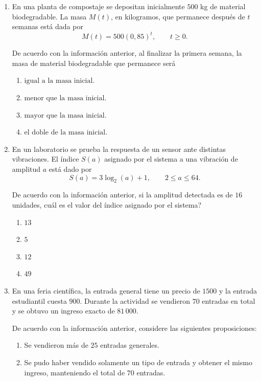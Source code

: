\documentclass[12pt]{article}
\newcommand{\opcion}[2]{\item $#2$}
\begin{document}
\begin{enumerate}[label=\textbf{\arabic*.}, start=29, itemsep=1cm]
\begin{enumerate}[label=\Alph*)]
  \opcion{A}{3}
  \opcion{B}{4}
  \opcion{C}{5}
  \opcion{D}{6}
\end{enumerate}

\Needspace{0.34\textheight}
\item
En una planta de compostaje se depositan inicialmente $500$ kg de material biodegradable. La masa $M(t)$, en kilogramos, que permanece despu\'es de $t$ semanas est\'a dada por
\[
  M(t)=500(0{,}85)^t, \qquad t\geq 0.
\]

De acuerdo con la informaci\'on anterior, al finalizar la primera semana, la masa de material biodegradable que permanece ser\'a

\begin{enumerate}[label=\Alph*)]
  \opcion{A}{\text{igual a la masa inicial.}}
  \opcion{B}{\text{menor que la masa inicial.}}
  \opcion{C}{\text{mayor que la masa inicial.}}
  \opcion{D}{\text{el doble de la masa inicial.}}
\end{enumerate}

\Needspace{0.34\textheight}
\item
En un laboratorio se prueba la respuesta de un sensor ante distintas vibraciones. El \'indice $S(a)$ asignado por el sistema a una vibraci\'on de amplitud $a$ est\'a dado por
\[
  S(a)=3\log_{2}(a)+1, \qquad 2\leq a\leq 64.
\]

De acuerdo con la informaci\'on anterior, si la amplitud detectada es de $16$ unidades, \textquestiondown cu\'al es el valor del \'indice asignado por el sistema?

\begin{enumerate}[label=\Alph*)]
  \opcion{A}{13}
  \opcion{B}{5}
  \opcion{C}{12}
  \opcion{D}{49}
\end{enumerate}

\setcounter{enumi}{42}
\Needspace{0.56\textheight}
\item
En una feria cient\'ifica, la entrada general tiene un precio de \textcolonmonetary $1500$ y la entrada estudiantil cuesta \textcolonmonetary $900$. Durante la actividad se vendieron $70$ entradas en total y se obtuvo un ingreso exacto de \textcolonmonetary $81\,000$.

De acuerdo con la informaci\'on anterior, considere las siguientes proposiciones:

\begin{enumerate}[label=\Roman*.]
  \item Se vendieron m\'as de $25$ entradas generales.
  \item Se pudo haber vendido solamente un tipo de entrada y obtener el mismo ingreso, manteniendo el total de $70$ entradas.
\end{enumerate}


\end{enumerate}
\end{document}
